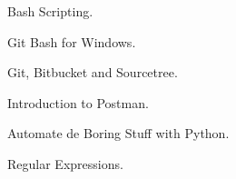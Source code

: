 {\faCertificate \color{emphasis} \hspace{2mm} Bash Scripting.}

{\faCertificate \color{emphasis} \hspace{2mm} Git Bash for Windows.}

{\faCertificate \color{emphasis} \hspace{2mm} Git, Bitbucket and Sourcetree.}

{\faCertificate \color{emphasis} \hspace{2mm} Introduction to Postman.}

{\faCertificate \color{emphasis} \hspace{2mm} Automate de Boring Stuff with Python.}

{\faCertificate \color{emphasis} \hspace{2mm} Regular Expressions.}

 


%
